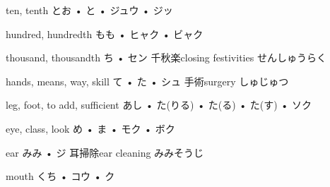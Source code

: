 



\setcounter{cardnum}{17}

		{ten, tenth}
		{とお • と • ジュウ • ジッ}
		{}{}
		{}{}
		{}{}
		{}{}
		{}{}

		{hundred, hundredth}
		{もも • ヒャク • ビャク}
		{}{}
		{}{}
		{}{}
		{}{}
		{}{}

		{thousand, thousandth}
		{ち • セン}
		{千秋楽}{closing festivities せんしゅうらく}
		{}{}
		{}{}
		{}{}
		{}{}

		{hands, means, way, skill}
		{て • た • シュ}
		{手術}{surgery しゅじゅつ}
		{}{}
		{}{}
		{}{}
		{}{}

		{leg, foot, to add, sufficient}
		{あし • た(りる) • た(る) • た(す) • ソク}
		{}{}
		{}{}
		{}{}
		{}{}
		{}{}

		{eye, class, look}
		{め • ま • モク • ボク}
		{}{}
		{}{}
		{}{}
		{}{}
		{}{}

		{ear}
		{みみ • ジ}
		{耳掃除}{ear cleaning みみそうじ}
		{}{}
		{}{}
		{}{}
		{}{}

		{mouth}
		{くち • コウ • ク}
		{}{}
		{}{}
		{}{}
		{}{}
		{}{}

